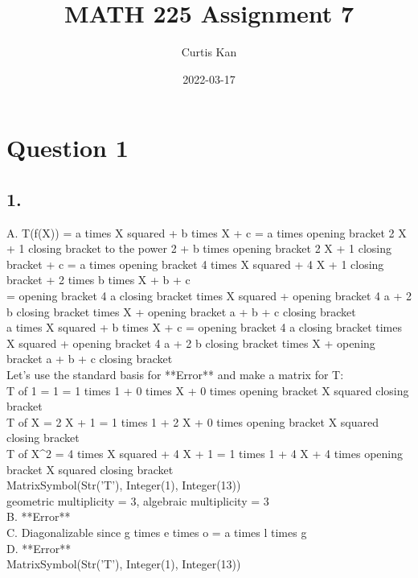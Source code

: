 \documentclass{article}
\title{MATH 225 Assignment 7}
\author{Curtis Kan}
\date{2022-03-17}
\begin{document}
\maketitle

\section*{Question 1}
\subsection*{1.}
A. T(f(X)) = a times X squared + b times X + c = a times opening bracket 2 X + 1 closing bracket to the power 2 + b times opening bracket 2 X + 1 closing bracket + c = a times opening bracket 4 times X squared + 4 X + 1 closing bracket + 2 times b times X + b + c \\ = opening bracket 4 a closing bracket times X squared + opening bracket 4 a + 2 b closing bracket times X + opening bracket a + b + c closing bracket
\\a times X squared + b times X + c = opening bracket 4 a closing bracket times X squared + opening bracket 4 a + 2 b closing bracket times X + opening bracket a + b + c closing bracket
\\Let's use the standard basis for **Error** and make a matrix for T:
\\T of 1 = 1 = 1 times 1 + 0 times X + 0 times opening bracket X squared closing bracket 
\\T of X = 2 X + 1 = 1 times 1 + 2 X + 0 times opening bracket X squared closing bracket
\\T of X^2 = 4 times X squared + 4 X + 1 = 1 times 1 + 4 X + 4 times opening bracket X squared closing bracket
\\[10px]
MatrixSymbol(Str('T'), Integer(1), Integer(13))
\\[Integer(1), Integer(2), Integer(4)] geometric multiplicity = 3, algebraic multiplicity  = 3
\\B. **Error**
\\C. Diagonalizable since g times e times o = a times l times g
\\D. **Error**
\\MatrixSymbol(Str('T'), Integer(1), Integer(13))
\end{document}
